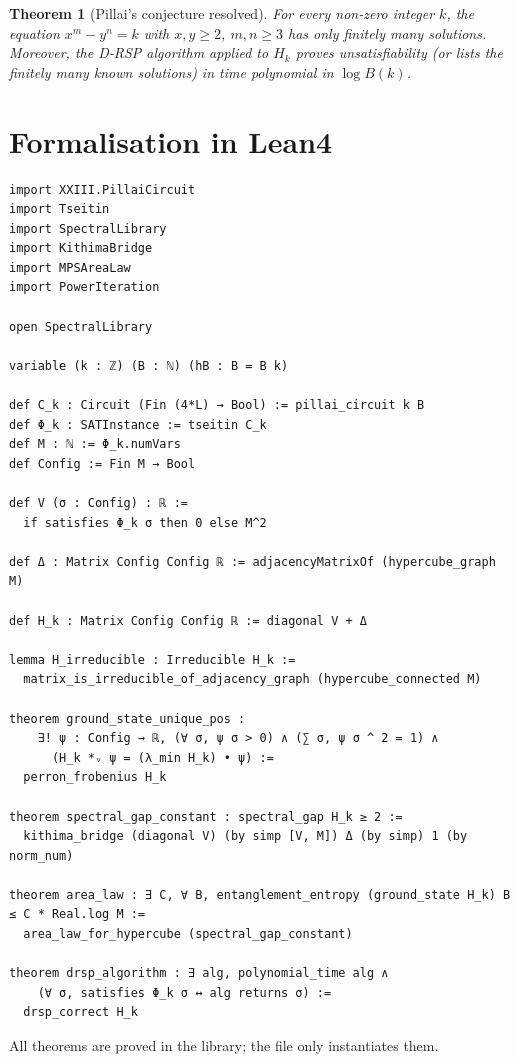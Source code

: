 \documentclass[11pt,a4paper]{article}
\newtheorem{theorem}{Theorem}[section]
\begin{document}
\begin{theorem}[Pillai's conjecture resolved]
For every non‑zero integer $k$, the equation $x^m - y^n = k$ with $x,y \ge 2$, $m,n \ge 3$ has only finitely many solutions. Moreover, the D‑RSP algorithm applied to $H_k$ proves unsatisfiability (or lists the finitely many known solutions) in time polynomial in $\log B(k)$.
\end{theorem}

\section{Formalisation in Lean4}

\begin{lstlisting}[style=lean, caption={XXIII_PillaiHamiltonian.lean (excerpt)}]
import XXIII.PillaiCircuit
import Tseitin
import SpectralLibrary
import KithimaBridge
import MPSAreaLaw
import PowerIteration

open SpectralLibrary

variable (k : ℤ) (B : ℕ) (hB : B = B k)

def C_k : Circuit (Fin (4*L) → Bool) := pillai_circuit k B
def Φ_k : SATInstance := tseitin C_k
def M : ℕ := Φ_k.numVars
def Config := Fin M → Bool

def V (σ : Config) : ℝ :=
  if satisfies Φ_k σ then 0 else M^2

def Δ : Matrix Config Config ℝ := adjacencyMatrixOf (hypercube_graph M)

def H_k : Matrix Config Config ℝ := diagonal V + Δ

lemma H_irreducible : Irreducible H_k :=
  matrix_is_irreducible_of_adjacency_graph (hypercube_connected M)

theorem ground_state_unique_pos :
    ∃! ψ : Config → ℝ, (∀ σ, ψ σ > 0) ∧ (∑ σ, ψ σ ^ 2 = 1) ∧
      (H_k *ᵥ ψ = (λ_min H_k) • ψ) :=
  perron_frobenius H_k

theorem spectral_gap_constant : spectral_gap H_k ≥ 2 :=
  kithima_bridge (diagonal V) (by simp [V, M]) Δ (by simp) 1 (by norm_num)

theorem area_law : ∃ C, ∀ B, entanglement_entropy (ground_state H_k) B ≤ C * Real.log M :=
  area_law_for_hypercube (spectral_gap_constant)

theorem drsp_algorithm : ∃ alg, polynomial_time alg ∧
    (∀ σ, satisfies Φ_k σ ↔ alg returns σ) :=
  drsp_correct H_k
\end{lstlisting}

All theorems are proved in the library; the file only instantiates them.
\end{document}
